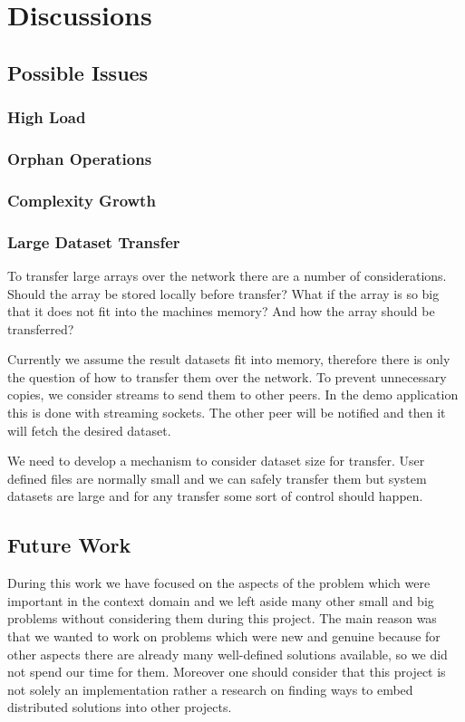 \chapter{Discussions}
\label{cha:discussions}

\section{Possible Issues}
\subsection{High Load}
\subsection{Orphan Operations}
\subsection{Complexity Growth}

\subsection{Large Dataset Transfer}
To transfer large arrays over the network there are a number of considerations. Should the array be stored locally before transfer?
What if the array is so big that it does not fit into the machines memory? And how the array should be transferred?

Currently we assume the result datasets fit into memory, therefore there is only the question of how 
to transfer them over the network. To prevent unnecessary copies, we consider streams to send them to
other peers. In the demo application this is done with streaming sockets. The other peer will be notified and then it will fetch the desired dataset.

We need to develop a mechanism to consider dataset size for transfer. User defined files are normally small and we can safely transfer them but
system datasets are large and for any transfer some sort of control should happen.

\section{Future Work}
During this work we have focused on the aspects of the problem which were important in the context domain and we left aside many other small and big problems without considering them during this project. The main
reason was that we wanted to work on problems which were new and genuine
because for other aspects there are already many well-defined solutions
available, so we did not spend our time for them. Moreover one should 
consider that this project is not solely an implementation rather a 
research on finding ways to embed distributed solutions into other projects.

